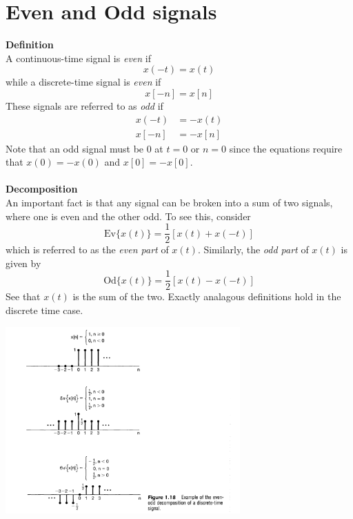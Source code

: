 \documentclass{report}
\begin{document}
\section{Even and Odd signals}
\textbf{Definition}\\
A continuous-time signal is \textit{even} if
\begin{equation*}
x(-t)=x(t)
\end{equation*}
while a discrete-time signal is \textit{even} if
\begin{equation*}
x[-n]=x[n]
\end{equation*}
These signals are referred to as \textit{odd} if
\begin{align*}
x(-t)&=-x(t)\\
x[-n]&=-x[n]
\end{align*}
Note that an odd signal must be 0 at $t=0$ or $n=0$ since the equations require that $x(0)=-x(0)$ and $x[0]=-x[0]$.
\\
\vspace{1mm}\\
\textbf{Decomposition}\\
An important fact is that any signal can be broken into a sum of two signals, where one is even and the other odd.
To see this, consider
\begin{equation*}
\text{Ev}\{x(t)\}=\frac{1}{2}[x(t)+x(-t)]
\end{equation*}
which is referred to as the \textit{even part} of $x(t)$. Similarly, the \textit{odd part} of $x(t)$ is given by
\begin{equation*}
\text{Od}\{x(t)\}=\frac{1}{2}[x(t)-x(-t)]
\end{equation*}
See that $x(t)$ is the sum of the two. Exactly analagous definitions hold in the discrete time case.
\begin{center}
\includegraphics[width=9cm]{a1}
\end{center}
\newpage
\end{document}
